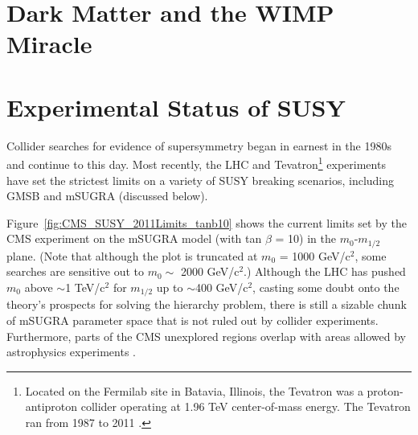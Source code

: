 \documentclass[dissertation.tex]{subfiles}
\begin{document}
\section{Dark Matter and the WIMP Miracle}


\section{Experimental Status of SUSY}

Collider searches for evidence of supersymmetry began in earnest in the 1980s \cite{SUSY_history} and continue to this day.  Most recently, the LHC and Tevatron\footnote{Located on the Fermilab site in Batavia, Illinois, the Tevatron was a proton-antiproton collider operating at 1.96 TeV center-of-mass energy.  The Tevatron ran from 1987 to 2011 \cite{Tevatron_lifetime}.} experiments have set the strictest limits on a variety of SUSY breaking scenarios, including GMSB and mSUGRA (discussed below).

Figure~\ref{fig:CMS_SUSY_2011Limits_tanb10} shows the current limits set by the CMS experiment on the mSUGRA model (with tan $\beta$ = 10) in the $m_{0}$-$m_{1/2}$ plane.  (Note that although the plot is truncated at $m_{0}$ = 1000 GeV/$\mbox{c}^{2}$, some searches are sensitive out to $m_{0} \sim$ 2000 GeV/$\mbox{c}^{2}$.)  Although the LHC has pushed $m_{0}$ above $\sim$1 TeV/$\mbox{c}^{2}$ for $m_{1/2}$ up to $\sim$400 GeV/$\mbox{c}^{2}$, casting some doubt onto the theory's prospects for solving the hierarchy problem, there is still a sizable chunk of mSUGRA parameter space that is not ruled out by collider experiments.  Furthermore, parts of the CMS unexplored regions overlap with areas allowed by astrophysics experiments \cite{CMSSM_fits}.
\end{document}
